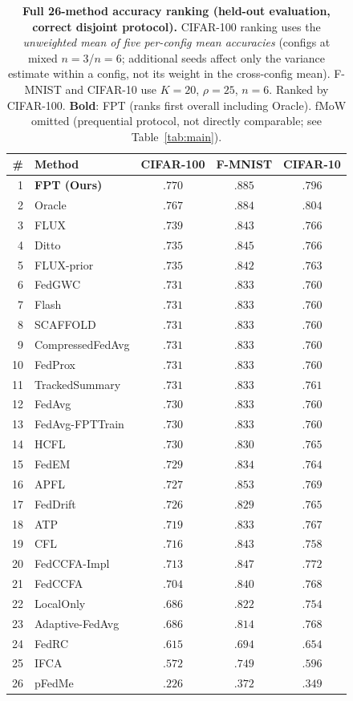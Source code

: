\documentclass[11pt]{article}
\begin{document}
\begin{table}[h]
\centering
\caption{\textbf{Full 26-method accuracy ranking (held-out evaluation, correct disjoint protocol).} CIFAR-100 ranking uses the \emph{unweighted mean of five per-config mean accuracies} (configs at mixed $n{=}3$/$n{=}6$; additional seeds affect only the variance estimate within a config, not its weight in the cross-config mean). F-MNIST and CIFAR-10 use $K{=}20$, $\rho{=}25$, $n{=}6$. Ranked by CIFAR-100. \textbf{Bold}: FPT (ranks first overall including Oracle). fMoW omitted (prequential protocol, not directly comparable; see Table~\ref{tab:main}).}
\label{tab:full}
\small
\setlength{\tabcolsep}{4pt}
\begin{tabular}{@{}rlccc@{}}
\toprule
\# & Method & \textbf{CIFAR-100} & \textbf{F-MNIST} & \textbf{CIFAR-10} \\
\midrule
1  & \textbf{FPT (Ours)} & $\mathbf{.770}$ & $\mathbf{.885}$ & $\mathbf{.796}$ \\
2  & Oracle & $.767$ & $.884$ & $.804$ \\
\midrule
3  & FLUX & $.739$ & $.843$ & $.766$ \\
4  & Ditto & $.735$ & $.845$ & $.766$ \\
5  & FLUX-prior & $.735$ & $.842$ & $.763$ \\
6  & FedGWC & $.731$ & $.833$ & $.760$ \\
7  & Flash & $.731$ & $.833$ & $.760$ \\
8  & SCAFFOLD & $.731$ & $.833$ & $.760$ \\
9  & CompressedFedAvg & $.731$ & $.833$ & $.760$ \\
10 & FedProx & $.731$ & $.833$ & $.760$ \\
11 & TrackedSummary & $.731$ & $.833$ & $.761$ \\
12 & FedAvg & $.730$ & $.833$ & $.760$ \\
13 & FedAvg-FPTTrain & $.730$ & $.833$ & $.760$ \\
14 & HCFL & $.730$ & $.830$ & $.765$ \\
15 & FedEM & $.729$ & $.834$ & $.764$ \\
16 & APFL & $.727$ & $.853$ & $.769$ \\
17 & FedDrift & $.726$ & $.829$ & $.765$ \\
18 & ATP & $.719$ & $.833$ & $.767$ \\
19 & CFL & $.716$ & $.843$ & $.758$ \\
20 & FedCCFA-Impl & $.713$ & $.847$ & $.772$ \\
21 & FedCCFA & $.704$ & $.840$ & $.768$ \\
22 & LocalOnly & $.686$ & $.822$ & $.754$ \\
23 & Adaptive-FedAvg & $.686$ & $.814$ & $.768$ \\
24 & FedRC & $.615$ & $.694$ & $.654$ \\
25 & IFCA & $.572$ & $.749$ & $.596$ \\
26 & pFedMe & $.226$ & $.372$ & $.349$ \\
\bottomrule
\end{tabular}
\end{table}
\end{document}
